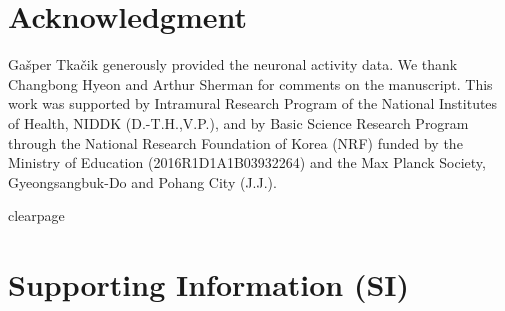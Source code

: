 \documentclass[prx,twocolumn,twoside,showpacs,superscriptaddress]{revtex4-1}
\begin{document}

\section*{Acknowledgment}
Ga\v{s}per Tka\v{c}ik  generously provided the neuronal activity data. We thank Changbong Hyeon and Arthur Sherman for comments on the manuscript.
This work was supported by Intramural Research Program of the National Institutes of Health, NIDDK (D.-T.H.,V.P.), and by Basic Science Research Program through the National Research Foundation of Korea (NRF) funded by the Ministry of Education (2016R1D1A1B03932264) and the Max Planck Society, Gyeongsangbuk-Do and Pohang City (J.J.).



clearpage
\setcounter{equation}{0}
\setcounter{figure}{0}
\setcounter{table}{0}
\setcounter{page}{1}
\makeatletter
\renewcommand{\theequation}{S\arabic{equation}}
\renewcommand{\thefigure}{S\arabic{figure}}

\section*{Supporting Information (SI)}
\end{document}

